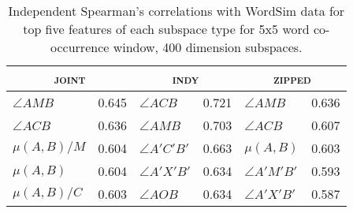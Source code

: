 
\begin{table}
\centering
\begin{tabular}{lr|lr|lr}
\hline
\multicolumn{2}{c}{\textsc{joint}} & \multicolumn{2}{c}{\textsc{indy}} & \multicolumn{2}{c}{\textsc{zipped}} \\
\hline
$\angle AMB$ & 0.645 & $\angle ACB$ & 0.721 & $\angle AMB$ & 0.636 \\
$\angle ACB$ & 0.636 & $\angle AMB$ & 0.703 & $\angle ACB$ & 0.607 \\
$\mu (A,B)/M$ & 0.604 & $\angle A'C'B'$ & 0.663 & $\mu (A,B)$ & 0.603 \\
$\mu (A,B)$ & 0.604 & $\angle A'X'B'$ & 0.634 & $\angle A'M'B'$ & 0.593 \\
$\mu (A,B)/C$ & 0.603 & $\angle AOB$ & 0.634 & $\angle A'X'B'$ & 0.587 \\
\hline
\end{tabular}
\caption{Independent Spearman's correlations with WordSim data for top five features of each subspace type for 5x5 word co-occurrence window, 400 dimension subspaces.}
\label{tab:ind-related}
\end{table}


